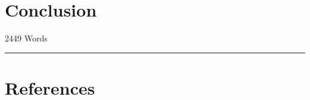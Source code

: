 \documentclass[
  12pt,
]{article}
\begin{document}
\hypertarget{conclusion}{%
\section{Conclusion}\label{conclusion}}

\begin{flushright}
2449 Words
\end{flushright}
\footnotesize

\begin{center}\rule{0.5\linewidth}{0.5pt}\end{center}

\hypertarget{references}{%
\section*{References}\label{references}}
\end{document}
